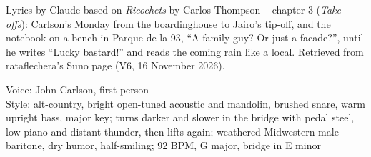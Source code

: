 
\begin{notes}
Lyrics by Claude based on \emph{Ricochets} by Carlos Thompson -- chapter 3 (\emph{Take-offs}): Carlson's Monday from the boardinghouse to Jairo's tip-off, and the notebook on a bench in Parque de la 93, ``A family guy? Or just a facade?'', until he writes ``Lucky bastard!'' and reads the coming rain like a local. Retrieved from rataflechera's Suno page (V6, 16 November 2026).
\end{notes}
\begin{style}
Voice: John Carlson, first person\\
Style: alt-country, bright open-tuned acoustic and mandolin, brushed snare, warm upright bass, major key; turns darker and slower in the bridge with pedal steel, low piano and distant thunder, then lifts again; weathered Midwestern male baritone, dry humor, half-smiling; 92 BPM, G major, bridge in E minor
\end{style}
